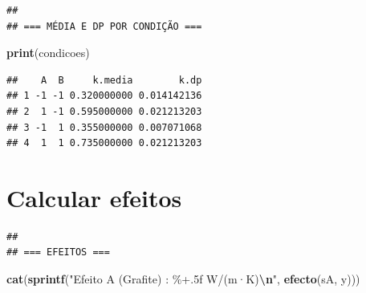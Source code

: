 \documentclass[
]{article}
\newenvironment{Shaded}{\begin{snugshade}}{\end{snugshade}}
\newcommand{\ControlFlowTok}[1]{\textcolor[rgb]{0.13,0.29,0.53}{\textbf{#1}}}
\newcommand{\DecValTok}[1]{\textcolor[rgb]{0.00,0.00,0.81}{#1}}
\newcommand{\FunctionTok}[1]{\textcolor[rgb]{0.13,0.29,0.53}{\textbf{#1}}}
\newcommand{\NormalTok}[1]{#1}
\newcommand{\OtherTok}[1]{\textcolor[rgb]{0.56,0.35,0.01}{#1}}
\newcommand{\SpecialCharTok}[1]{\textcolor[rgb]{0.81,0.36,0.00}{\textbf{#1}}}
\newcommand{\StringTok}[1]{\textcolor[rgb]{0.31,0.60,0.02}{#1}}
\begin{document}
\begin{verbatim}
## 
## === MÉDIA E DP POR CONDIÇÃO ===
\end{verbatim}

\begin{Shaded}
\begin{Highlighting}[]
\FunctionTok{print}\NormalTok{(condicoes)}
\end{Highlighting}
\end{Shaded}

\begin{verbatim}
##    A  B     k.media        k.dp
## 1 -1 -1 0.320000000 0.014142136
## 2  1 -1 0.595000000 0.021213203
## 3 -1  1 0.355000000 0.007071068
## 4  1  1 0.735000000 0.021213203
\end{verbatim}

\section{Calcular efeitos}\label{calcular-efeitos}

\begin{Shaded}
\end{Shaded}

\begin{verbatim}
## 
## === EFEITOS ===
\end{verbatim}

\begin{Shaded}
\begin{Highlighting}[]
\FunctionTok{cat}\NormalTok{(}\FunctionTok{sprintf}\NormalTok{(}\StringTok{"Efeito A  (Grafite)   : \%+.5f W/(m·K)}\SpecialCharTok{\textbackslash{}n}\StringTok{"}\NormalTok{, }\FunctionTok{efecto}\NormalTok{(sA,  y)))}
\end{Highlighting}
\end{Shaded}
\end{document}
